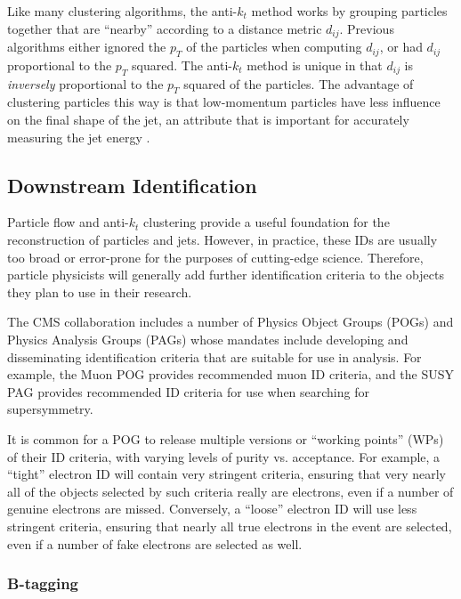 Like many clustering algorithms, the anti-$k_t$ method works by
grouping particles together that are ``nearby'' according to a
distance metric $d_{ij}$. Previous algorithms either ignored the $p_T$
of the particles when computing $d_{ij}$, or had $d_{ij}$ proportional
to the $p_T$ squared. The anti-$k_t$ method is unique in that $d_{ij}$
is \emph{inversely} proportional to the $p_T$ squared of the
particles. The advantage of clustering particles this way is that
low-momentum particles have less influence on the final shape of the
jet, an attribute that is important for accurately measuring the jet
energy \cite{antikt}.

\subsection{Downstream Identification}
\label{ssec:cms:reco:downstream}

Particle flow and anti-$k_t$ clustering provide a useful foundation
for the reconstruction of particles and jets. However, in practice,
these IDs are usually too broad or error-prone for the
purposes of cutting-edge science. Therefore, particle physicists will
generally add further identification criteria to the objects they plan
to use in their research.

The CMS collaboration includes a number of Physics Object Groups
(POGs) and Physics Analysis Groups (PAGs) whose mandates include
developing and disseminating identification criteria that are suitable
for use in analysis. For example, the Muon POG provides recommended
muon ID criteria, and the SUSY PAG provides recommended
ID criteria for use when searching for supersymmetry.

It is common for a POG to release multiple versions or ``working
points'' (WPs) of their ID criteria, with varying levels of purity
vs. acceptance. For example, a ``tight'' electron ID will contain very
stringent criteria, ensuring that very nearly all of the objects selected
by such criteria really are electrons, even if a number of genuine
electrons are missed. Conversely, a ``loose'' electron ID will
use less stringent criteria, ensuring that nearly all true electrons
in the event are selected, even if a number of fake electrons are
selected as well.

\subsubsection{B-tagging}
\label{sssec:cms:reco:btagging}

